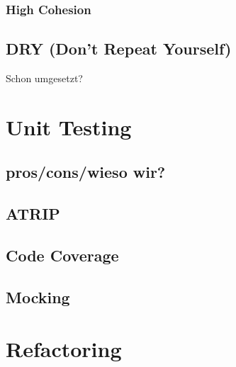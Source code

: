 \documentclass[
10pt, %
a4paper, %
oneside, %
headinclude,footinclude, %
BCOR5mm, %
]{scrartcl}
\begin{document}
\subsubsection{High Cohesion}
\subsection{DRY (Don't Repeat Yourself)}
Schon umgesetzt?


\section{Unit Testing}
\subsection{pros/cons/wieso wir?}
\subsection{ATRIP}
\subsection{Code Coverage}
\subsection{Mocking}
\newpage
\section{Refactoring}
\end{document}
